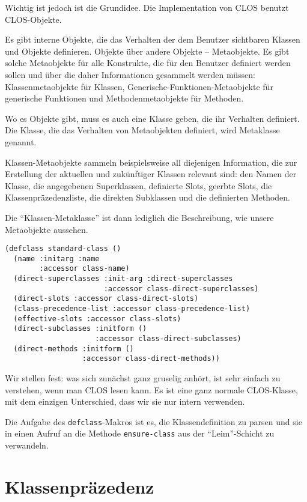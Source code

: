 Wichtig ist jedoch ist die Grundidee. Die Implementation von CLOS benutzt CLOS-Objekte.

Es gibt interne Objekte, die das Verhalten der dem Benutzer sichtbaren Klassen und Objekte definieren. Objekte über andere Objekte -- Metaobjekte. Es gibt solche Metaobjekte für alle Konstrukte, die für den Benutzer definiert werden sollen und über die daher Informationen gesammelt werden müssen: Klassenmetaobjekte für Klassen, Generische-Funktionen-Metaobjekte für generische Funktionen und Methodenmetaobjekte für Methoden. 

Wo es Objekte gibt, muss es auch eine Klasse geben, die ihr Verhalten definiert. Die Klasse, die das Verhalten von Metaobjekten definiert, wird Metaklasse genannt. 

Klassen-Metaobjekte sammeln beispielsweise all diejenigen Information, die zur Erstellung der aktuellen und zukünftiger Klassen relevant sind: den Namen der Klasse, die angegebenen Superklassen, definierte Slots, geerbte Slots, die Klassenpräzedenzliste, die direkten Subklassen und die definierten Methoden. 

Die ``Klassen-Metaklasse'' ist dann lediglich die Beschreibung, wie unsere Metaobjekte aussehen.

\begin{lstlisting}
(defclass standard-class ()
  (name :initarg :name
        :accessor class-name)
  (direct-superclasses :init-arg :direct-superclasses
                       :accessor class-direct-superclasses)
  (direct-slots :accessor class-direct-slots)
  (class-precedence-list :accessor class-precedence-list)
  (effective-slots :accessor class-slots)
  (direct-subclasses :initform ()
                     :accessor class-direct-subclasses)
  (direct-methods :initform ()
                  :accessor class-direct-methods))
\end{lstlisting}

Wir stellen fest: was sich zunächst ganz gruselig anhört, ist sehr einfach zu verstehen, wenn man CLOS lesen kann. Es ist eine ganz normale CLOS-Klasse, mit dem einzigen Unterschied, dass wir sie nur intern verwenden.

Die Aufgabe des \texttt{defclass}-Makros ist es, die Klassendefinition zu parsen und sie in einen Aufruf an die Methode \texttt{ensure-class} aus der ``Leim''-Schicht zu verwandeln. 

\section{Klassenpräzedenz}


